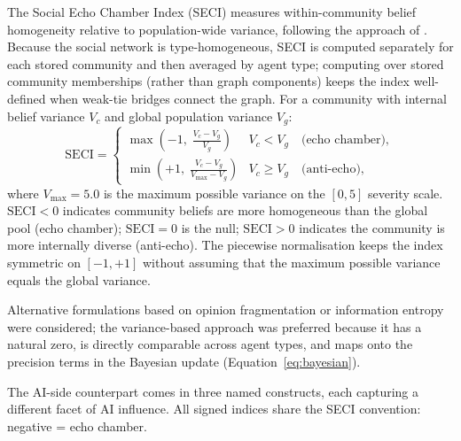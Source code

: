 The Social Echo Chamber Index (SECI) measures within-community belief homogeneity
relative to population-wide variance, following the approach of
\citet{cinelli2021echo}.
Because the social network is type-homogeneous, SECI is computed separately for
each stored community and then averaged by agent type; computing over stored
community memberships (rather than graph components) keeps the index well-defined
when weak-tie bridges connect the graph.
For a community with internal belief variance $V_c$ and global population variance
$V_g$:
%
\begin{equation}
  \mathrm{SECI} =
  \begin{cases}
    \displaystyle\max\!\left(-1,\;\frac{V_c - V_g}{V_g}\right)
      & V_c < V_g \quad\text{(echo chamber)}, \\[8pt]
    \displaystyle\min\!\left(+1,\;\frac{V_c - V_g}{V_{\max} - V_g}\right)
      & V_c \geq V_g \quad\text{(anti-echo)},
  \end{cases}
  \label{eq:seci}
\end{equation}
%
where $V_{\max}=5.0$ is the maximum possible variance on the $[0,5]$ severity
scale.
$\mathrm{SECI}<0$ indicates community beliefs are more homogeneous than the global
pool (echo chamber); $\mathrm{SECI}=0$ is the null; $\mathrm{SECI}>0$ indicates
the community is more internally diverse (anti-echo).
The piecewise normalisation keeps the index symmetric on $[-1,+1]$ without
assuming that the maximum possible variance equals the global variance.

Alternative formulations based on opinion fragmentation \citep{Bail2018} or
information entropy \citep{Sasahara2021} were considered; the variance-based
approach was preferred because it has a natural zero, is directly comparable across
agent types, and maps onto the precision terms in the Bayesian update
(Equation~\ref{eq:bayesian}).

The AI-side counterpart comes in three named constructs, each capturing a
different facet of AI influence.
All signed indices share the SECI convention: negative = echo chamber.


